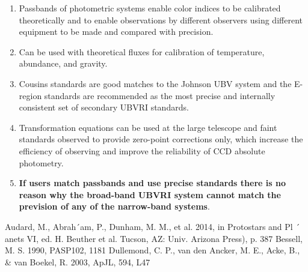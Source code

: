 \documentclass[twocolumn]{aastex6}
\begin{document}
\begin{enumerate}
\begin{enumerate}
\begin{enumerate}
					\item Passbands of photometric systems enable color indices to be calibrated theoretically and to enable observations by different observers using different equipment to be made and compared with precision.
					\item Can be used with theoretical fluxes for calibration of temperature, abundance, and gravity.
					\item Cousins standards are good matches to the Johnson UBV system and the E-region standards are recommended as the most precise and internally consistent set of secondary UBVRI standards.
					\item Transformation equations can be used at the large telescope and faint standards observed to provide zero-point corrections only, which increase the efficiency of observing and improve the reliability of CCD absolute photometry.
					\item \textbf{If users match passbands and use precise standards there is no reason why the broad-band UBVRI system cannot match the prevision of any of the narrow-band systems}.
				\end{enumerate}
		\end{enumerate}
\end{enumerate}

\acknowledgments



\vspace{5mm}

\begin{thebibliography}{}

Audard, M., Abrah´am, P., Dunham, M. M., et al. 2014, in Protostars and Pl ´ anets VI, ed. H. Beuther et al. Tucson, AZ: Univ. Arizona Press), p. 387
Bessell, M. S. 1990, PASP102, 1181
Dullemond, C. P., van den Ancker, M. E., Acke, B., \& van Boekel, R. 2003, ApJL, 594, L47
\clearpage

\end{thebibliography}



\end{document}
